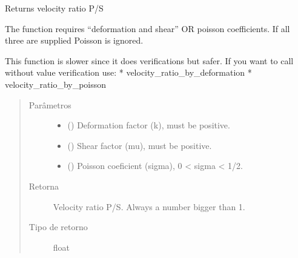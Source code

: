 \documentclass[letterpaper,10pt,brazil]{sphinxmanual}
\begin{document}
\begin{fulllineitems}
\label{\detokenize{source/base:base.velocity_ratio}}
Returns velocity ratio P/S

The function requires “deformation and shear”  OR poisson coefficients. If
all three are supplied Poisson is ignored.

This function is slower since it does verifications but safer.  If you
want to call without value verification use:
* velocity\_ratio\_by\_deformation
* velocity\_ratio\_by\_poisson
\begin{quote}\begin{description}
\item[{Parâmetros}] \leavevmode\begin{itemize}
\item {} 
 () \textendash{} Deformation factor (k), must be positive.

\item {} 
 () \textendash{} Shear factor (mu), must be positive.

\item {} 
 () \textendash{} Poisson coeficient (sigma),  0 \textless{} sigma \textless{} 1/2.

\end{itemize}

\item[{Retorna}] \leavevmode
Velocity ratio P/S. Always a number bigger than 1.

\item[{Tipo de retorno}] \leavevmode
float

\end{description}\end{quote}

\end{fulllineitems}

\end{document}
